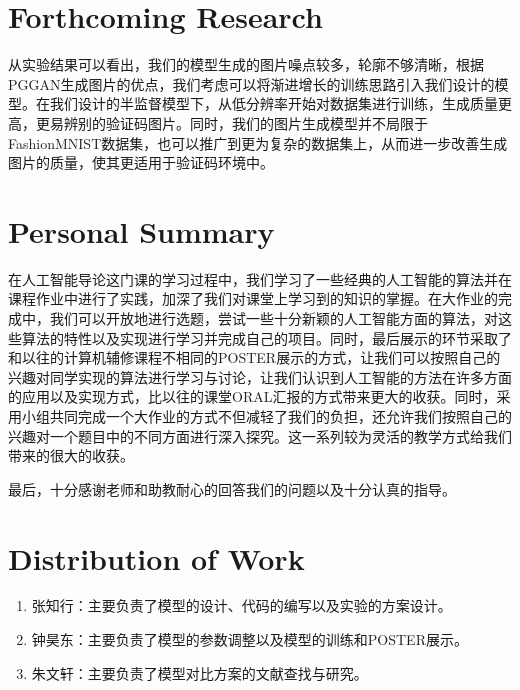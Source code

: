 \documentclass[12pt]{article}
\begin{document}
\section*{Forthcoming Research}

  从实验结果可以看出，我们的模型生成的图片噪点较多，轮廓不够清晰，根据PGGAN生成图片的优点，我们考虑可以将渐进增长的训练思路引入我们设计的模型。在我们设计的半监督模型下，从低分辨率开始对数据集进行训练，生成质量更高，更易辨别的验证码图片。同时，我们的图片生成模型并不局限于FashionMNIST数据集，也可以推广到更为复杂的数据集上，从而进一步改善生成图片的质量，使其更适用于验证码环境中。

\printbibliography[title={References}]
\newpage

\section* {Personal Summary}
  在人工智能导论这门课的学习过程中，我们学习了一些经典的人工智能的算法并在课程作业中进行了实践，加深了我们对课堂上学习到的知识的掌握。在大作业的完成中，我们可以开放地进行选题，尝试一些十分新颖的人工智能方面的算法，对这些算法的特性以及实现进行学习并完成自己的项目。同时，最后展示的环节采取了和以往的计算机辅修课程不相同的POSTER展示的方式，让我们可以按照自己的兴趣对同学实现的算法进行学习与讨论，让我们认识到人工智能的方法在许多方面的应用以及实现方式，比以往的课堂ORAL汇报的方式带来更大的收获。同时，采用小组共同完成一个大作业的方式不但减轻了我们的负担，还允许我们按照自己的兴趣对一个题目中的不同方面进行深入探究。这一系列较为灵活的教学方式给我们带来的很大的收获。

  最后，十分感谢老师和助教耐心的回答我们的问题以及十分认真的指导。


\section*{Distribution of Work}
\begin{enumerate}
	\item 张知行：主要负责了模型的设计、代码的编写以及实验的方案设计。
	\item 钟昊东：主要负责了模型的参数调整以及模型的训练和POSTER展示。
	\item 朱文轩：主要负责了模型对比方案的文献查找与研究。
\end{enumerate}
\end{document}
